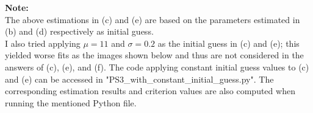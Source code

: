 \documentclass[letterpaper,12pt]{article}
\theoremstyle{definition}
\begin{document}
\noindent\textbf{Note:}\\
The above estimations in (c) and (e) are based on the parameters estimated in (b) and (d) respectively as initial guess. \\
I also tried applying $\mu = 11$ and $\sigma = 0.2$ as the initial guess in (c) and (e); this yielded worse fits as the images shown below and thus are not considered in the answers of (c), (e), and (f). The code applying constant initial guess values to (c) and (e) can be accessed in "PS3\_with\_constant\_initial\_guess.py". The corresponding estimation results and criterion values are also computed when running the mentioned Python file.

\begin{figure}[htb]\centering\captionsetup{width=6.0in}
  \caption{\textbf{}}
\end{figure} \\

\begin{figure}[htb]\centering\captionsetup{width=6.0in}
  \caption{\textbf{}}
\end{figure} \\
\\
\\
\clearpage
\end{document}
